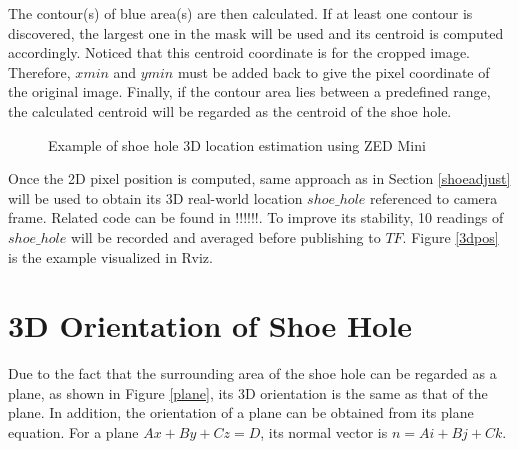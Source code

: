 The contour(s) of blue area(s) are then calculated. If at least one contour is discovered, the largest one in the mask will be used and its centroid is computed accordingly. Noticed that this centroid coordinate is for the cropped image. Therefore, $xmin$ and $ymin$ must be added back to give the pixel coordinate of the original image. Finally, if the contour area lies between a predefined range, the calculated centroid will be regarded as the centroid of the shoe hole.

\begin{figure}[H]
\centering
{}
\caption{Example of shoe hole 3D location estimation using ZED Mini}
\end{figure}

Once the 2D pixel position is computed, same approach as in Section \ref{shoeadjust} will be used to obtain its 3D real-world location $shoe\_hole$ referenced to camera frame. Related code can be found in !!!!!!. To improve its stability, 10 readings of $shoe\_hole$ will be recorded and averaged before publishing to $TF$. Figure \ref{3dpos} is the example visualized in Rviz.

\section{3D Orientation of Shoe Hole}
Due to the fact that the surrounding area of the shoe hole can be regarded as a plane, as shown in Figure \ref{plane}, its 3D orientation is the same as that of the plane. In addition, the orientation of a plane can be obtained from its plane equation. For a plane $Ax + By + Cz = D$, its normal vector is $n = Ai + Bj + Ck$.

